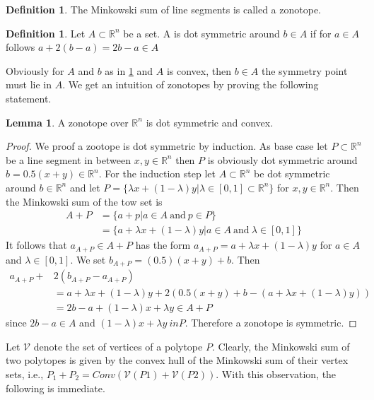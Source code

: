 \documentclass{article}
\theoremstyle{definition}
\newtheorem{lemma}[theorem]{Lemma}
\newtheorem{definition}[theorem]{Definition}
\begin{document}
\begin{definition}
The Minkowski sum of line segments is called a zonotope.
\end{definition}

\begin{definition}
\label{def:dot_sym}
Let $A \subset \mathbb{R}^{n}$ be a set. A is dot symmetric around $b \in A$ if for $a \in A$ follows $a + 2(b-a)=2b-a \in A$
\end{definition}

Obviously for $A$ and $b$ as in \ref{def:dot_sym} and $A$ is convex, then $b \in A$ the symmetry point must lie in $A$. We get an intuition of zonotopes by proving the following statement.

\begin{lemma}
\label{lem:zon_sym_conv}
A zonotope over $\mathbb{R}^{n}$ is dot symmetric and convex.
\end{lemma}
\begin{proof}
We proof a zootope is dot symmetric by induction. As base case let $P \subset \mathbb{R}^{n}$ be a line segment in between $x, y \in \mathbb{R}^{n}$ then $P$ is obviously dot symmetric around $b=0.5(x+y) \in \mathbb{R}^{n}$. For the induction step let $A \subset \mathbb{R}^{n}$ be dot symmetric around $b \in \mathbb{R}^{n}$ and let $P = \{ \lambda x + (1- \lambda) y | \lambda \in [0,1] \subset \mathbb{R}^{n} \}$ for $x, y \in \mathbb{R}^{n}$. Then the Minkowski sum of the tow set is
\begin{align*}
A + P 
&= \{ a + p | a \in A \ \text{and} \ p \in P \} \\
&= \{ a + \lambda x + (1- \lambda) y | a \in A \ \text{and} \ \lambda \in [0,1] \}
\end{align*}
It follows that $a_{A+P} \in A+P$ has the form $a_{A+P}=a + \lambda x + (1- \lambda)y$ for $a\in A$ and $\lambda \in [0,1]$. We set $b_{A+P}=(0.5)(x+y) + b$. Then
\begin{align*}
a_{A+P} + &2(b_{A+P} - a_{A+P}) \\
&= a + \lambda x + (1- \lambda)y + 2( 0.5(x+y) + b - (a + \lambda x + (1-\lambda)y)) \\
&= 2b-a + (1- \lambda) x + \lambda y \in A+P
\end{align*}
since $2b-a \in A$ and $(1- \lambda) x + \lambda y \ in P$. Therefore a zonotope is symmetric.
\end{proof}

Let $\mathcal{V}$ denote the set of vertices of a polytope $P$. Clearly, the Minkowski sum of two polytopes is given by the convex hull of the Minkowski sum of their vertex sets, i.e., $P_{1} + P_{2} = Conv(\mathcal{V}(P1) + \mathcal{V}(P2))$. With this observation, the
following is immediate.
\end{document}
